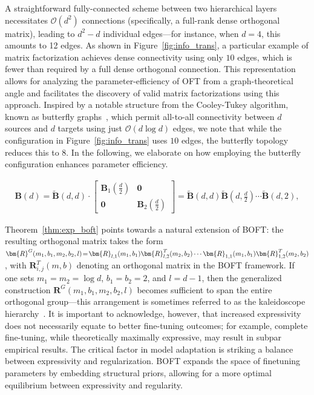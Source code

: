A straightforward fully-connected scheme between two hierarchical layers necessitates $\mathcal{O}(d^2)$ connections (specifically, a full-rank dense orthogonal matrix), leading to $d^2-d$ individual edges—for instance, when $d=4$, this amounts to 12 edges. As shown in Figure~\ref{fig:info_trans}, a particular example of matrix factorization achieves dense connectivity using only $10$ edges, which is fewer than required by a full dense orthogonal connection. This representation allows for analyzing the parameter-efficiency of OFT from a graph-theoretical angle and facilitates the discovery of valid matrix factorizations using this approach. Inspired by a notable structure from the Cooley-Tukey algorithm, known as butterfly graphs~\cite{cooley1965algorithm}, which permit all-to-all connectivity between $d$ sources and $d$ targets using just $\mathcal{O}(d\log d)$ edges, we note that while the configuration in Figure~\ref{fig:info_trans} uses $10$ edges, the butterfly topology reduces this to $8$. In the following, we elaborate on how employing the butterfly configuration enhances parameter efficiency.

\begin{equation}
\begin{aligned}
    \bm{B}(d)=\tilde{\bm{B}}(d,d)\!\cdot\!\begin{bmatrix}
    \bm{B}_1(\frac{d}{2})\!\!\!\!\! & \bm{0} \\
    \bm{0}\!\!\!\!\! &\bm{B}_2(\frac{d}{2})
    \end{bmatrix}= \tilde{\bm{B}}(d,d)\tilde{\bm{B}}(d,\frac{d}{2})\cdots\tilde{\bm{B}}(d,2),
\end{aligned}
\end{equation}

Theorem~\ref{thm:exp_boft} points towards a natural extension of BOFT: the resulting orthogonal matrix takes the form $\thickmuskip=2mu \medmuskip=2mu \bm{R}^G(m_1,b_1,m_2,b_2,l)=\bm{R}_{l,1}(m_1,b_1)\bm{R}_{l,2}^T(m_2,b_2)\cdots\bm{R}_{1,1}(m_1,b_1)\bm{R}_{1,2}^T(m_2,b_2)$, with $\bm{R}_{i,j}^T(m,b)$ denoting an orthogonal matrix in the BOFT framework. If one sets $m_1=m_2=\log d$, $b_1=b_2=2$, and $l=d-1$, then the generalized construction $\bm{R}^G(m_1,b_1,m_2,b_2,l)$ becomes sufficient to span the entire orthogonal group—this arrangement is sometimes referred to as the kaleidoscope hierarchy~\cite{dao2019kaleidoscope}. It is important to acknowledge, however, that increased expressivity does not necessarily equate to better fine-tuning outcomes; for example, complete fine-tuning, while theoretically maximally expressive, may result in subpar empirical results. The critical factor in model adaptation is striking a balance between expressivity and regularization. BOFT expands the space of finetuning parameters by embedding structural priors, allowing for a more optimal equilibrium between expressivity and regularity.


